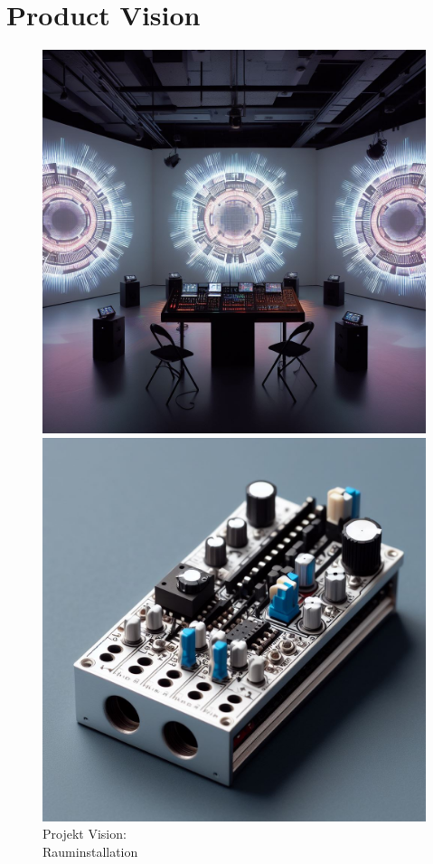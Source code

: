 \documentclass[12pt]{scrartcl}%
\theoremstyle{nonumberplain}
\begin{document}
\section{Product Vision}
\begin{figure}[h]
   \begin{minipage}[b]{.4\linewidth} %
      \includegraphics[width=\linewidth]{vision1}
      \caption{Projekt Vision:\\Rauminstallation}
   \end{minipage}
   \hspace{.1\linewidth}%
   \begin{minipage}[b]{.4\linewidth} %
      \includegraphics[width=\linewidth]{controller1}

\end{minipage}
\end{figure}
\end{document}
